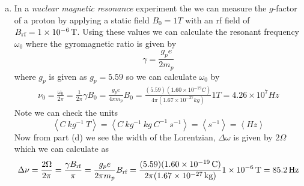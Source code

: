 \documentclass[11pt]{article}
\numberwithin{equation}{section}
\newcommand{\Brf}{B_{\textnormal{rf}}}
\begin{document}
\begin{enumerate}[(a)]
\item
In a \emph{nuclear magnetic resonance} experiment the we can measure the $g$-factor of a proton by applying a static field $B_0=1\unit{T}$ with an rf field of $\Brf=1\times10^{-6}\unit{T}$. Using these values we can calculate the resonant frequency $\omega_0$ where the gyromagnetic ratio is given by
$$\gamma = \frac{g_pe}{2m_p}$$
where $g_p$ is given as $g_p = 5.59$ so we can calculate $\omega_0$ by
\begin{align*}
\nu_0 = \frac{\omega_0}{2\pi} = \frac{1}{2\pi}\gamma B_0 = \frac{g_pe}{4\pi m_p}B_0 = \frac{(5.59)(1.60\times10^{-19}\unit{C})}{4\pi(1.67\times10^{-27}\unit{kg})}1\unit{T} = 4.26\times10^{7}\unit{Hz}
\end{align*}
Note we can check the units
$$\left\langle\unit{C\ kg^{-1}\ T}\right\rangle = \left\langle\unit{C\ kg^{-1}\ kg\ C^{-1}\ s^{-1}}\right\rangle = \left\langle\unit{s^{-1}}\right\rangle = \left\langle\unit{Hz}\right\rangle$$
Now from part (d) we see the width of the Lorentzian, $\Delta\omega$ is given by $2\Omega$ which we can calculate as
$$\Delta\nu = \frac{2\Omega}{2\pi} = \frac{\gamma\Brf}{\pi} = \frac{g_pe}{2\pi m_p}\Brf = \frac{(5.59)(1.60\times10^{-19}\unit{C})}{2\pi(1.67\times10^{-27}\unit{kg})}1\times10^{-6}\unit{T} = 85.2\unit{Hz}$$ 
\end{enumerate}
\end{document}
